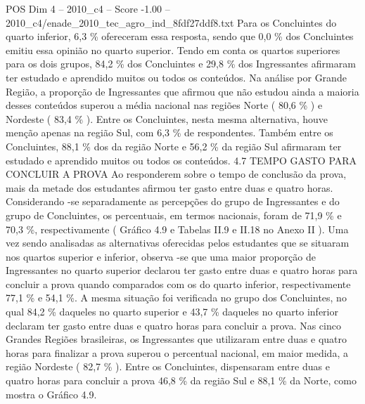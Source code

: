 \begin{textsample}{POS Dim 4 – 2010\_c4 – Score -1.00 – 2010\_c4/enade\_2010\_tec\_agro\_ind\_8fdf27ddf8.txt}
Para os Concluintes do quarto inferior, 6,3 \% ofereceram essa resposta, sendo que 0,0 \% dos Concluintes emitiu essa opinião no quarto superior.
Tendo em conta os quartos superiores para os dois grupos, 84,2 \% dos Concluintes e 29,8 \% dos Ingressantes afirmaram ter estudado e aprendido muitos ou todos os conteúdos.
Na análise por Grande Região, a proporção de Ingressantes que afirmou que não estudou ainda a maioria desses conteúdos superou a média nacional nas regiões Norte ( 80,6 \% ) e Nordeste ( 83,4 \% ).
Entre os Concluintes, nesta mesma alternativa, houve menção apenas na região Sul, com 6,3 \% de respondentes.
Também entre os Concluintes, 88,1 \% dos da região Norte e 56,2 \% da região Sul afirmaram ter estudado e aprendido muitos ou todos os conteúdos. 4.7 TEMPO GASTO PARA CONCLUIR A PROVA Ao responderem sobre o tempo de conclusão da prova, mais da metade dos estudantes afirmou ter gasto entre duas e quatro horas.
Considerando -se separadamente as percepções do grupo de Ingressantes e do grupo de Concluintes, os percentuais, em termos nacionais, foram de 71,9 \% e 70,3 \%, respectivamente ( Gráfico 4.9 e Tabelas II.9 e II.18 no Anexo II ).
Uma vez sendo analisadas as alternativas oferecidas pelos estudantes que se situaram nos quartos superior e inferior, observa -se que uma maior proporção de Ingressantes no quarto superior declarou ter gasto entre duas e quatro horas para concluir a prova quando comparados com os do quarto inferior, respectivamente 77,1 \% e 54,1 \%.
A mesma situação foi verificada no grupo dos Concluintes, no qual 84,2 \% daqueles no quarto superior e 43,7 \% daqueles no quarto inferior declaram ter gasto entre duas e quatro horas para concluir a prova.
Nas cinco Grandes Regiões brasileiras, os Ingressantes que utilizaram entre duas e quatro horas para finalizar a prova superou o percentual nacional, em maior medida, a região Nordeste ( 82,7 \% ).
Entre os Concluintes, dispensaram entre duas e quatro horas para concluir a prova 46,8 \% da região Sul e 88,1 \% da Norte, como mostra o Gráfico 4.9.

\end{textsample}

